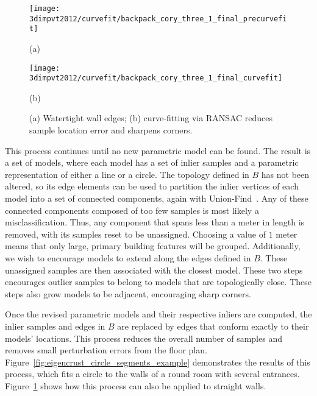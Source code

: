 \documentclass[12pt,onecolumn,oneside]{book}
\begin{document}
\begin{figure}[t]

\begin{minipage}[b]{0.45\linewidth}
  \centering
  \centerline{\texttt{[image: 3dimpvt2012/curvefit/backpack\_cory\_three\_1\_final\_precurvefit]}}
  \centerline{(a)}
\end{minipage}
\hfill
\begin{minipage}[b]{0.45\linewidth}
  \centering
  \centerline{\texttt{[image: 3dimpvt2012/curvefit/backpack\_cory\_three\_1\_final\_curvefit]}}
  \centerline{(b)}
\end{minipage}

\caption[Sharpening floor plan corners with RANSAC.]{(a) Watertight wall edges; (b) curve-fitting via RANSAC reduces sample location error and sharpens corners.}
\label{fig:eigencrust_wall_straightening}

\end{figure}

This process continues until no new parametric model can be found.  The result is a set of models, where each model has a set of inlier samples and a parametric representation of either a line or a circle.  The topology defined in $B$ has not been altered, so its edge elements can be used to partition the inlier vertices of each model into a set of connected components, again with Union-Find~\cite{Unionfind}.  Any of these connected components composed of too few samples is most likely a misclassification.  Thus, any component that spans less than a meter in length is removed, with its samples reset to be unassigned.  Choosing a value of $1$ meter means that only large, primary building features will be grouped.  Additionally, we wish to encourage models to extend along the edges defined in $B$.  These unassigned samples are then associated with the closest model.  These two steps encourages outlier samples to belong to models that are topologically close.  These steps also grow models to be adjacent, encouraging sharp corners.

Once the revised parametric models and their respective inliers are computed, the inlier samples and edges in $B$ are replaced by edges that conform exactly to their models' locations.  This process reduces the overall number of samples and removes small perturbation errors from the floor plan.  Figure~\ref{fig:eigencrust_circle_segments_example} demonstrates the results of this process, which fits a circle to the walls of a round room with several entrances. Figure~\ref{fig:eigencrust_wall_straightening} shows how this process can also be applied to straight walls.
\end{document}
